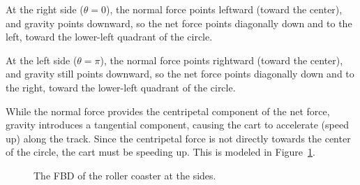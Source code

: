 At the right side ($\theta = 0$), the normal force points leftward (toward the center), and gravity points downward, so the net force points diagonally down and to the left, toward the lower-left quadrant of the circle.

At the left side ($\theta = \pi$), the normal force points rightward (toward the center), and gravity still points downward, so the net force points diagonally down and to the right, toward the lower-left quadrant of the circle.

While the normal force provides the centripetal component of the net force, gravity introduces a tangential component, causing the cart to accelerate (speed up) along the track. Since the centripetal force is not directly towards the center of the circle, the cart must be speeding up. This is modeled in Figure~\ref{fig:roller_sides}.

\begin{figure}[H]
  \centering
  \caption{The FBD of the roller coaster at the sides.}
  \label{fig:roller_sides}
\end{figure}


